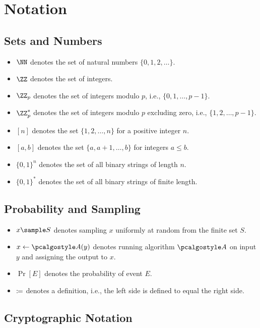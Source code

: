 \section{Notation}\label{sec:notation}

\subsection{Sets and Numbers}

\begin{itemize}
  \item $\NN$ denotes the set of natural numbers $\{0, 1, 2, \ldots\}$.
  \item $\ZZ$ denotes the set of integers.
  \item $\ZZ_p$ denotes the set of integers modulo $p$, i.e., $\{0, 1, \ldots, p-1\}$.
  \item $\ZZ_p^*$ denotes the set of integers modulo $p$ excluding zero, i.e., $\{1, 2, \ldots, p-1\}$.
  \item $[n]$ denotes the set $\{1, 2, \ldots, n\}$ for a positive integer $n$.
  \item $[a, b]$ denotes the set $\{a, a+1, \ldots, b\}$ for integers $a \leq b$.
  \item $\{0, 1\}^n$ denotes the set of all binary strings of length $n$.
  \item $\{0, 1\}^*$ denotes the set of all binary strings of finite length.
\end{itemize}

\subsection{Probability and Sampling}

\begin{itemize}
  \item $x \sample S$ denotes sampling $x$ uniformly at random from the finite set $S$.
  \item $x \gets \algo{A}(y)$ denotes running algorithm $\algo{A}$ on input $y$ and assigning the output to $x$.
  \item $\Pr[E]$ denotes the probability of event $E$.
  \item $\coloneq$ denotes a definition, i.e., the left side is defined to equal the right side.
\end{itemize}

\subsection{Cryptographic Notation}

